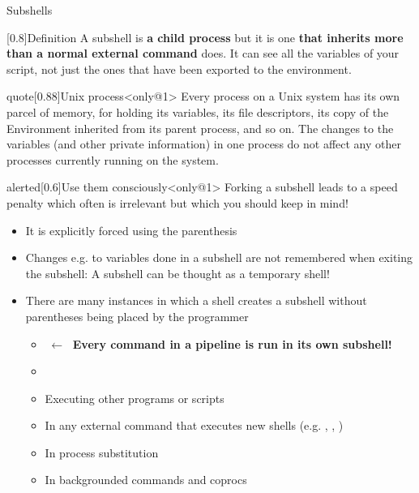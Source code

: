 \begin{frame}{Subshells}
    \vspace{-5mm}
    \begin{overlayarea}{\textwidth}{0.7\textheight}
        \begin{varblock}{}[0.8\textwidth]{Definition}
            A subshell is \textbf{a child process} but it is one \textbf{that inherits more than a normal external command} does.
            It can see all the variables of your script, not just the ones that have been exported to the environment.
        \end{varblock}
        \begin{varblock}{quote}[0.88\textwidth]{Unix process}<only@1>
            Every process on a Unix system has its own parcel of memory, for holding its variables, its file descriptors, its copy of the Environment inherited from its parent process, and so on.
            The changes to the variables (and other private information) in one process do not affect any other processes currently running on the system.
        \end{varblock}
        \begin{varblock}{alerted}[0.6\textwidth]{Use them consciously}<only@1>
            Forking a subshell leads to a speed penalty which often is irrelevant but which you should keep in mind!
        \end{varblock}
        \begin{itemize}[<2>]
            \item It is explicitly forced using the parenthesis \PB{\texttt{(\ldots)}}
            \item Changes e.g. to variables done in a subshell are not remembered when exiting the subshell: A subshell can be thought as a temporary shell!
            \item There are many instances in which a shell creates a subshell without parentheses being placed by the programmer
                  \begin{itemize}
                      \item {} $\;\longleftarrow\;$ \alert{\textbf{Every command in a pipeline is run in its own subshell!}}
                      \item {}
                      \item Executing other programs or scripts
                      \item In any external command that executes new shells (e.g. , , )
                      \item In process substitution
                      \item In backgrounded commands and coprocs
                  \end{itemize}
        \end{itemize}
    \end{overlayarea}
\end{frame}
